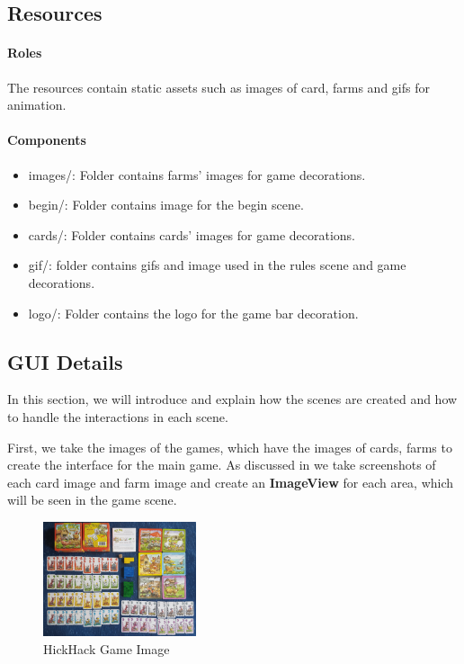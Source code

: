 \documentclass[conference]{IEEEtran}
\begin{document}
\subsection{Resources}
\paragraph{Roles}
The resources contain static assets such as images of card, farms and gifs for animation. 

\paragraph{Components}
\begin{itemize}
    \item images/: Folder contains farms' images for game decorations.
    \item begin/: Folder contains image for the begin scene.
    \item cards/: Folder contains cards' images for game decorations.
    \item gif/: folder contains gifs and image used in the rules scene and game decorations.
    \item logo/: Folder contains the logo for the game bar decoration. 
\end{itemize}

\subsection{GUI Details}
In this section, we will introduce and explain how the scenes are created and how to handle the interactions in each scene.

First, we take the images of the games, which have the images of cards, farms to create the interface for the main game. As discussed in \cite{b5} we take screenshots of each card image and farm image and create an \textbf{ImageView} for each area, which will be seen in the game scene.
\begin{figure}[h!]
    \centering
    \includegraphics[width=0.4\textwidth]{img/465654734_8820796054708413_4663815448351147464_n.jpg} %
    \caption{HickHack Game Image}
    \label{fig:intro-scene}
\end{figure}
\end{document}
